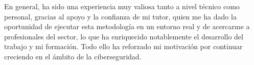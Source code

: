 \documentclass[a4paper, 11pt]{article}
\begin{document}
En general, ha sido una experiencia muy valiosa tanto a nivel técnico como personal, gracias al apoyo y la confianza de mi tutor, quien me ha dado la oportunidad de ejecutar esta metodología en un entorno real y de acercarme a profesionales del sector, lo que ha enriquecido notablemente el desarrollo del trabajo y mi formación. Todo ello ha reforzado mi motivación por continuar creciendo en el ámbito de la ciberseguridad.







\clearpage
\thispagestyle{nohead}


\end{document}
